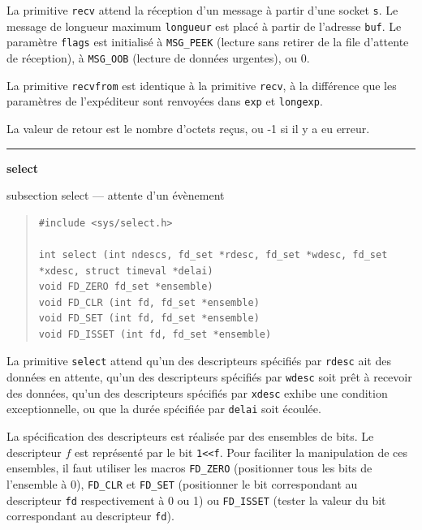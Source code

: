 \documentclass [twoside] {report}
\newcommand {\primitive} [1]
    {
	\phantomsection
	{\large \textbf {#1}}
	\addcontentsline {toc} {subsection} {#1}
    }
\newcommand {\separation}
    {
	\vspace {5mm}
	\nopagebreak
	\hrule
    }
\begin{document}
La primitive \texttt {recv} attend la réception
d'un message à partir d'une
socket \texttt {s}. Le message de longueur maximum
\texttt {longueur} est placé à partir de l'adresse \texttt {buf}.
Le paramètre \texttt {flags} est initialisé à \texttt {MSG\_PEEK}
(lecture sans retirer de la file d'attente de réception), à
\texttt {MSG\_OOB} (lecture de données urgentes), ou 0.

La primitive \texttt {recvfrom} est identique à la primitive
\texttt {recv}, à la différence que les paramètres de
l'expéditeur sont renvoyées dans \texttt {exp} et \texttt {longexp}.

La valeur de retour est le nombre d'octets reçus, ou -1 si
il y a eu erreur.



\separation
\primitive {select} --- attente d'un évènement

\begin {quote}
\begin {verbatim}
#include <sys/select.h>

int select (int ndescs, fd_set *rdesc, fd_set *wdesc, fd_set *xdesc, struct timeval *delai)
void FD_ZERO fd_set *ensemble)
void FD_CLR (int fd, fd_set *ensemble)
void FD_SET (int fd, fd_set *ensemble)
void FD_ISSET (int fd, fd_set *ensemble)

\end{verbatim}
\end {quote}

La primitive \texttt {select} attend qu'un des descripteurs
spécifiés par \texttt {rdesc} ait des données en attente, qu'un
des descripteurs spécifiés par \texttt {wdesc} soit prêt à
recevoir des données, qu'un des descripteurs spécifiés par
\texttt {xdesc} exhibe une condition exceptionnelle, ou
que la durée spécifiée par \texttt {delai} soit écoulée.

La spécification des descripteurs est réalisée par des ensembles
de bits. Le descripteur $f$ est représenté par le bit \verb|1<<f|.
Pour faciliter la manipulation de ces ensembles, il faut utiliser les
macros \texttt {FD\_ZERO} (positionner tous les bits de l'ensemble à 0),
\texttt {FD\_CLR} et \texttt {FD\_SET} (positionner le bit correspondant
au descripteur \texttt {fd} respectivement à 0 ou 1) ou \texttt
{FD\_ISSET} (tester la valeur du bit correspondant au descripteur \texttt
{fd}).
\end{document}
